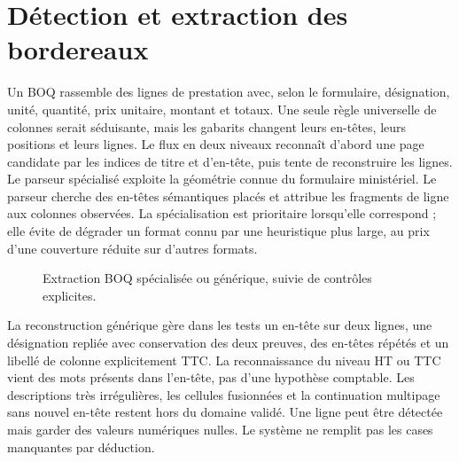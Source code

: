 \section{Détection et extraction des bordereaux}
Un BOQ rassemble des lignes de prestation avec, selon le formulaire, désignation, unité, quantité, prix unitaire, montant et totaux. Une seule règle universelle de colonnes serait séduisante, mais les gabarits changent leurs en-têtes, leurs positions et leurs lignes. Le flux en deux niveaux reconnaît d'abord une page candidate par les indices de titre et d'en-tête, puis tente de reconstruire les lignes. Le parseur spécialisé \texttt{} exploite la géométrie connue du formulaire ministériel. Le parseur \texttt{} cherche des en-têtes sémantiques placés et attribue les fragments de ligne aux colonnes observées. La spécialisation est prioritaire lorsqu'elle correspond ; elle évite de dégrader un format connu par une heuristique plus large, au prix d'une couverture réduite sur d'autres formats.

\begin{figure}[htbp]\centering
{}
\caption{Extraction BOQ spécialisée ou générique, suivie de contrôles explicites.}\label{fig:boq-pipeline}
\end{figure}

La reconstruction générique gère dans les tests un en-tête sur deux lignes, une désignation repliée avec conservation des deux preuves, des en-têtes répétés et un libellé de colonne explicitement TTC. La reconnaissance du niveau HT ou TTC vient des mots présents dans l'en-tête, pas d'une hypothèse comptable. Les descriptions très irrégulières, les cellules fusionnées et la continuation multipage sans nouvel en-tête restent hors du domaine validé. Une ligne peut être détectée mais garder des valeurs numériques nulles. Le système ne remplit pas les cases manquantes par déduction.

